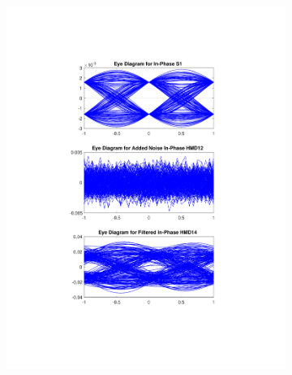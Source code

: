 \begin{figure}[H]
	\centering
	\begin{subfigure}{.45\textwidth}
		\centering
		\includegraphics[clip, trim=5cm 4cm 5cm 4cm, width=\textwidth]{./sdf/m_qam_system/figures/eyes/if_n_p_60_03_rc.pdf}
	\end{subfigure}
	\begin{subfigure}{.45\textwidth}
		\centering

\end{subfigure}
\end{figure}

